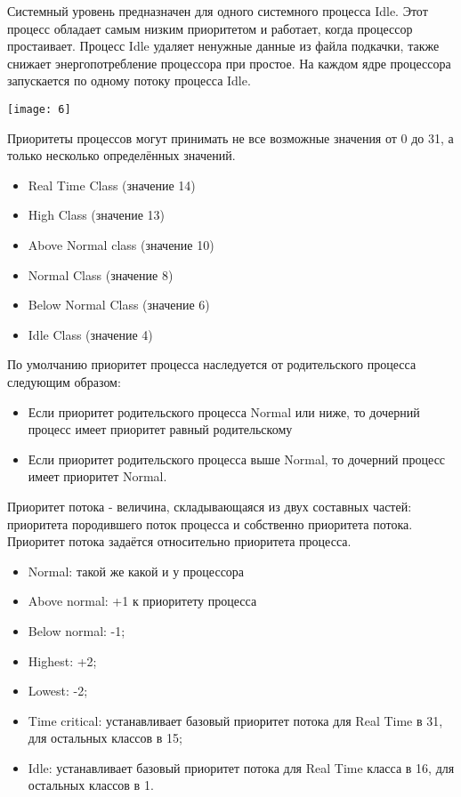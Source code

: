 \documentclass[a4paper]{article}
\begin{document}
Системный уровень предназначен для одного системного процесса Idle. Этот процесс обладает самым низким приоритетом и работает, когда процессор простаивает. Процесс Idle удаляет ненужные данные из файла подкачки, также снижает энергопотребление процессора при простое. На каждом ядре процессора запускается по одному потоку процесса Idle.\\
\begin{center}
	\texttt{[image: 6]}
\end{center}
Приоритеты процессов могут принимать не все возможные значения от 0 до 31, а только несколько определённых значений.\\
\begin{itemize}
	\item Real Time Class (значение 14)
	\item High Class (значение 13)
	\item Above Normal class (значение 10)
	\item Normal Class (значение 8)
	\item Below Normal Class (значение 6)
	\item Idle Class (значение 4)
\end{itemize}
По умолчанию приоритет процесса наследуется от родительского процесса следующим образом:\\
\begin{itemize}
	\item Если приоритет родительского процесса Normal или ниже, то дочерний процесс имеет приоритет равный родительскому
	\item Если приоритет родительского процесса выше Normal, то дочерний процесс имеет приоритет Normal.
\end{itemize}
Приоритет потока - величина, складывающаяся из двух составных частей: приоритета породившего поток процесса и собственно приоритета потока.\\
Приоритет потока задаётся относительно приоритета процесса.
\begin{itemize}
	\item Normal: такой же какой и у процессора
	\item Above normal: +1 к приоритету процесса
	\item Below normal: -1;
	\item Highest: +2;
	\item Lowest: -2;
	\item Time critical: устанавливает базовый приоритет потока для Real Time в 31, для остальных классов в 15;
	\item Idle: устанавливает базовый приоритет потока для Real Time класса в 16, для остальных классов в 1.
\end{itemize}
\end{document}
